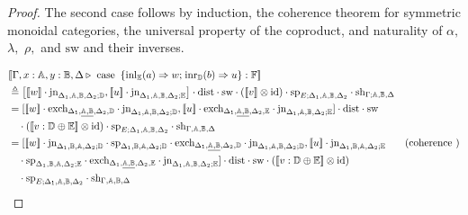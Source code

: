 \documentclass[10pt,a4paper]{amsart}
\theoremstyle{definition}
\theoremstyle{definition}
\theoremstyle{definition}
\theoremstyle{definition}
\theoremstyle{definition}
\theoremstyle{definition}
\begin{document}
\begin{proof}
The second case follows by induction, the coherence theorem for symmetric monoidal categories, the universal property of the coproduct, and naturality of $\alpha,$ $\lambda,$ $\rho,$ and $\text{sw}$ and their inverses.

\begin{align*}
  & [\![\Gamma,x:\typeA, y:\typeB, \Delta \vljud \text{ case }  \hspace{2pt}  \{\text{inl}_{\typeE} (a) \Rightarrow w ; \hspace{1pt} \text{inr}_{\typeD} (b) \Rightarrow u\}: \typeF]\!] \\
  & \triangleq    \left[[\![ w ]\!] \cdot  \text{jn}_{\Delta_{1},\typeA,\typeB,  \Delta_{2};\typeD},[\![ u ]\!] \cdot  \text{jn}_{\Delta_{1},\typeA,\typeB,  \Delta_{2};\typeE}\right]   \cdot \text{dist} \cdot \text{sw} \cdot ([\![v]\!] \otimes \text{id}) \cdot \text{sp}_{E; \Delta_{1},\typeA,\typeB,  \Delta_{2}} \cdot \text{sh}_{\Gamma;\typeA, \typeB,\Delta}  \\
  & = [[\![ w ]\!]  \cdot \text{exch}_{\Delta_{1},\underline{\typeA,\typeB},  \Delta_{2},\typeD} \cdot \text{jn}_{\Delta_{1},\typeA,\typeB,  \Delta_{2};\typeD},    [\![u ]\!] \cdot \text{exch}_{\Delta_{1},\underline{\typeA,\typeB},  \Delta_{2},\typeE} \cdot \text{jn}_{\Delta_{1},\typeA,\typeB,  \Delta_{2};\typeE} ] \cdot \text{dist} \cdot \text{sw} \\
  & \hspace{10pt} \cdot ([\![  v : \typeD \oplus \typeE  ]\!] \otimes \text{id}) \cdot\text{sp}_{E; \Delta_{1},\typeA,\typeB,  \Delta_{2}} \cdot \text{sh}_{\Gamma,\typeA, \typeB,\Delta} \\
  & = [[\![ w ]\!] \cdot \text{jn}_{\Delta_{1} ,\typeB,\typeA,  \Delta_{2};\typeD} \cdot \text{sp}_{\Delta_{1}, \typeB, \typeA, \Delta_{2};\typeD} \cdot  \text{exch}_{\Delta_{1},\underline{\typeA,\typeB},  \Delta_{2},\typeD} \cdot  \text{jn}_{\Delta_{1},\typeA,\typeB,  \Delta_{2};\typeD}  ,    [\![u ]\!] \cdot \text{jn}_{\Delta_{1} ,\typeB,\typeA,  \Delta_{2};\typeE} & {\text{(coherence )}} \\
  & \hspace{10pt} \cdot \text{sp}_{\Delta_{1}, \typeB, \typeA, \Delta_{2};\typeE} \cdot  \text{exch}_{\Delta_{1},\underline{\typeA,\typeB},  \Delta_{2},\typeE} \cdot  \text{jn}_{\Delta_{1},\typeA,\typeB,  \Delta_{2};\typeE} ] \cdot \text{dist} \cdot \text{sw} \cdot ([\![  v : \typeD \oplus \typeE  ]\!] \otimes \text{id}) \\
  & \hspace{10pt} \cdot\text{sp}_{E; \Delta_{1},\typeA,\typeB,  \Delta_{2}} \cdot \text{sh}_{\Gamma,\typeA, \typeB,\Delta} \\

\end{align*}
\end{proof}
\end{document}
